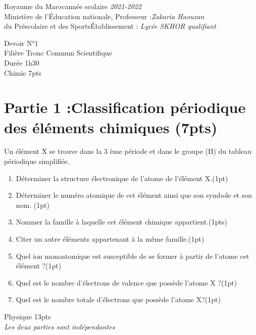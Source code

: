 \documentclass[12pt]{article}
\newcommand\headerMe[2]{\noindent{}#1\hfill#2}
\begin{document}
\headerMe{Royaume du Maroc}{année scolaire \emph{2021-2022}}\\
\headerMe{Ministère de l'Éducation nationale, }{  Professeur :\emph{Zakaria Haouzan}}\\
\headerMe{du Préscolaire et des Sports}{Établissement : \emph{Lycée SKHOR qualifiant}}\\

\begin{center}
Devoir  N°1 \\
   Filière Tronc Commun Scientifique\\
Durée 1h30
\\
    \vspace{.2cm}
\hrulefill
\Large{Chimie 7pts}
\hrulefill\\

\end{center}
 \section*{Partie 1 :Classification périodique des éléments chimiques \dotfill (7pts) }
Un élément X se trouve dans la 3 ème période et dans le groupe (II) du tableau périodique simplifiée.
\begin{enumerate}
    \item Déterminer la structure électronique de l'atome de l'élément X.\dotfill(1pt)

    \item Déterminer le numéro atomique de cet élément ainsi que son symbole et son nom. \dotfill(1pt)
    \item Nommer la famille à laquelle cet élément chimique appartient.\dotfill(1pts)
    \item Citer un autre éléments appartenant à la même famille.\dotfill(1pt)
 \item Quel ion monoatomique est susceptible de se former à partir de l’atome cet élément ?\dotfill(1pt)
 \item Quel est le nombre d'électrons de valence que possède l’atome X ?\dotfill(1pt)
 \item Quel est le nombre totale d'électrons que possède l’atome X?\dotfill(1pt)
\end{enumerate}

\begin{center}
\hrulefill
\Large{Physique 13pts}
\hrulefill\\
    \emph{Les deux parties sont indépendantes}
\end{center}
\end{document}
